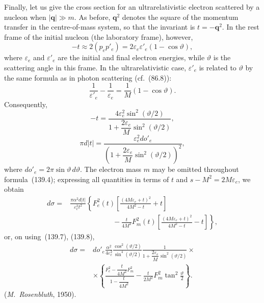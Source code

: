 Finally, let us give the cross section for an ultrarelativistic electron scattered by a nucleon when $|\mathbf q|\gg m$. As before, $\mathbf q^2$ denotes the square of the momentum transfer in the centre-of-mass system, so that the invariant is $t=-\mathbf q^2$. In the rest frame of the initial nucleon (the laboratory frame), however,
\[
-t\approx2(p_ep'_e)=2\varepsilon_e\varepsilon'_e(1-\cos\vartheta),
\]
where $\varepsilon_e$ and $\varepsilon'_e$ are the initial and final electron energies, while $\vartheta$ is the scattering angle in this frame. In the ultrarelativistic case, $\varepsilon'_e$ is related to $\vartheta$ by the same formula as in photon scattering (cf.~(86.8)):
\[
\frac{1}{\varepsilon'_e}-\frac{1}{\varepsilon_e}=\frac{1}{M}(1-\cos\vartheta).
\]
Consequently,
\begin{equation}
-t=\frac{4\varepsilon_e^2\sin^2(\vartheta/2)}
{1+\dfrac{2\varepsilon_e}{M}\sin^2(\vartheta/2)},
\tag{139.7}
\end{equation}
\begin{equation}
\pi d|t|=\frac{\varepsilon_e^2do'_e}
{\left(1+\dfrac{2\varepsilon_e}{M}\sin^2(\vartheta/2)\right)^2},
\tag{139.8}
\end{equation}
where $do'_e=2\pi\sin\vartheta\,d\vartheta$. The electron mass $m$ may be omitted throughout formula~(139.4); expressing all quantities in terms of $t$ and $s-M^2=2M\varepsilon_e$, we obtain
\begin{equation}
\begin{aligned}
d\sigma={}&\frac{\pi\alpha^2d|t|}{\varepsilon_e^2t^2}
\left\{F_e^2(t)\left[\frac{(4M\varepsilon_e+t)^2}{4M^2-t}+t\right]\right.\\
&\left.\hspace{6em}{}-\frac{t}{4M^2}F_m^2(t)
\left[\frac{(4M\varepsilon_e+t)^2}{4M^2-t}-t\right]\right\},
\end{aligned}
\tag{139.9}
\end{equation}
or, on using~(139.7), (139.8),
\begin{equation}
\begin{aligned}
d\sigma={}&do'_e\frac{\alpha^2}{4\varepsilon_e^2}
\frac{\cos^2(\vartheta/2)}{\sin^4(\vartheta/2)}
\frac{1}{1+\dfrac{2\varepsilon_e}{M}\sin^2(\vartheta/2)}\times{}\\
&\times\left\{\frac{F_e^2-\dfrac{t}{4M^2}F_m^2}{1-\dfrac{t}{4M^2}}
-\frac{t}{2M^2}F_m^2\tan^2\frac{\vartheta}{2}\right\}.
\end{aligned}
\tag{139.10}
\end{equation}
(\emph{M.~Rosenbluth}, 1950).

